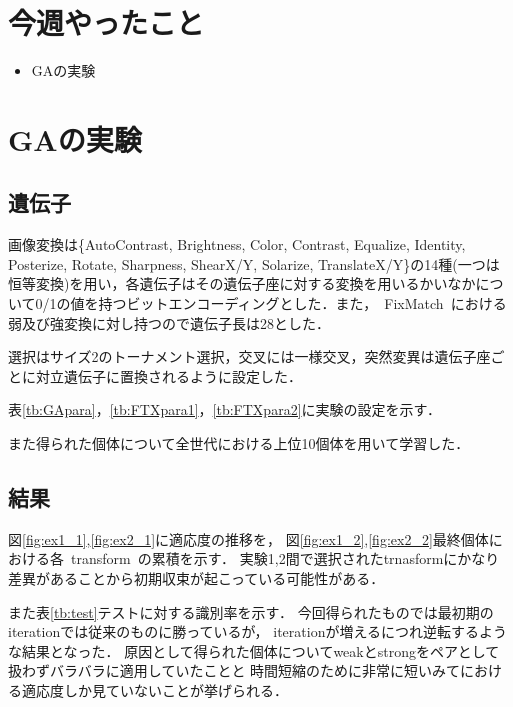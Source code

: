 \documentclass[twocolumn]{jarticle}     %
\begin{document}


\section{今週やったこと}

\begin{itemize}
	\item GAの実験
\end{itemize}

\section{GAの実験}
\subsection{遺伝子}
画像変換は\{AutoContrast, Brightness, Color, Contrast, Equalize, Identity, Posterize, Rotate, Sharpness, ShearX/Y, Solarize, TranslateX/Y\}の14種(一つは恒等変換)を用い，各遺伝子はその遺伝子座に対する変換を用いるかいなかについて0/1の値を持つビットエンコーディングとした．また，\ FixMatch\ における弱及び強変換に対し持つので遺伝子長は28とした．

選択はサイズ2のトーナメント選択，交叉には一様交叉，突然変異は遺伝子座ごとに対立遺伝子に置換されるように設定した．

表\ref{tb:GApara}，\ref{tb:FTXpara1}，\ref{tb:FTXpara2}に実験の設定を示す．

また得られた個体について全世代における上位10個体を用いて学習した．
\subsection{結果}
図\ref{fig:ex1_1},\ref{fig:ex2_1}に適応度の推移を，
図\ref{fig:ex1_2},\ref{fig:ex2_2}最終個体における各\ transform\ の累積を示す．
実験1,2間で選択されたtrnasformにかなり差異があることから初期収束が起こっている可能性がある．

また表\ref{tb:test}テストに対する識別率を示す．
今回得られたものでは最初期のiterationでは従来のものに勝っているが，
iterationが増えるにつれ逆転するような結果となった．
原因として得られた個体についてweakとstrongをペアとして扱わずバラバラに適用していたことと
時間短縮のために非常に短いみてにおける適応度しか見ていないことが挙げられる．
\end{document}
